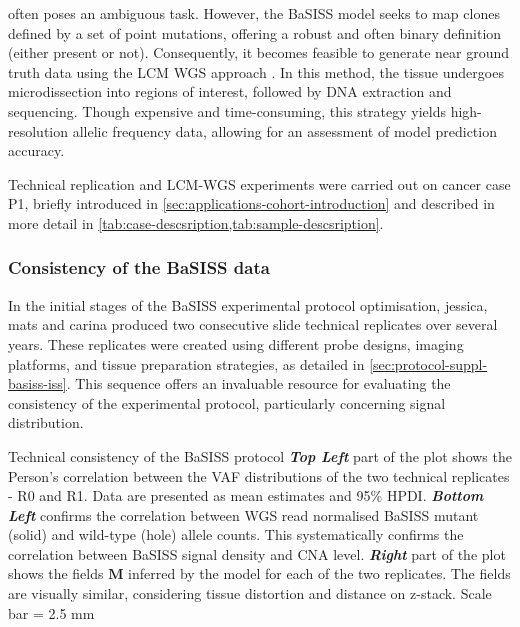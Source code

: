  often poses an ambiguous task. However, the \ac{BaSISS} model seeks to map clones defined by a set of point mutations, offering a robust and often binary definition (either present or not). Consequently, it becomes feasible to generate near ground truth data using the \ac{LCM} \ac{WGS} approach \parencite{Shen2000-xj}. In this method, the tissue undergoes microdissection into regions of interest, followed by DNA extraction and sequencing. Though expensive and time-consuming, this strategy yields high-resolution allelic frequency data, allowing for an assessment of model prediction accuracy.

Technical replication and \acs{LCM}-\acs{WGS} experiments were carried out on cancer case P1, briefly introduced in \cref{sec:applications-cohort-introduction} and described in more detail in \cref{tab:case-descsription,tab:sample-descsription}.

\subsubsection*{Consistency of the \acs{BaSISS} data}
In the initial stages of the \ac{BaSISS} experimental protocol optimisation, \ac{jessica}, \ac{mats} and \ac{carina} produced two consecutive slide technical replicates over several years. These replicates were created using different probe designs, imaging platforms, and tissue preparation strategies, as detailed in \cref{sec:protocol-suppl-basiss-iss}. This sequence offers an invaluable resource for evaluating the consistency of the experimental protocol, particularly concerning signal distribution.

    {Technical consistency of the \acs{BaSISS} protocol}
    {\textbf{\textit{Top Left}} part of the plot shows the Person's correlation between the \ac{VAF} distributions of the two technical replicates - R0 and R1. Data are presented as mean
    estimates and 95\% HPDI. \textbf{\textit{Bottom Left}} confirms the correlation between \ac{WGS} read normalised \ac{BaSISS} mutant (solid) and wild-type (hole) allele counts. This systematically confirms the correlation between \ac{BaSISS} signal density and \ac{CNA} level. \textbf{\textit{Right}} part of the plot shows the fields $\mathbf{M}$ inferred by the model for each of the two replicates. The fields are visually similar, considering tissue distortion and distance on z-stack. Scale bar = 2.5 mm}

